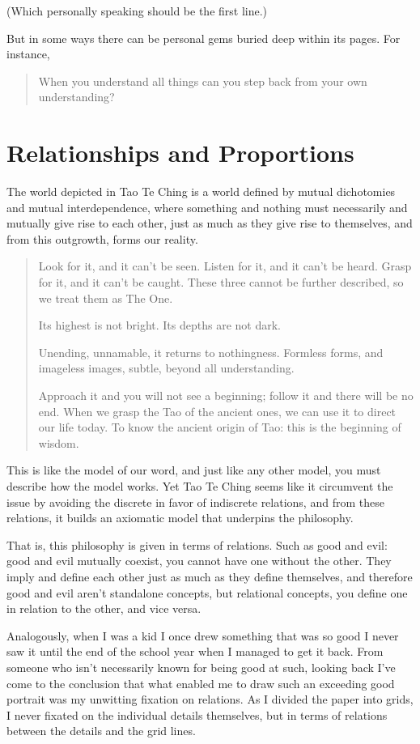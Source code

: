 (Which personally speaking should be the first line.)

But in some ways there can be personal gems buried deep within its pages. For instance,
\begin{quotation}
    When you understand all things can you step back from your own understanding? 
\end{quotation}


\section{Relationships and Proportions}

The world depicted in Tao Te Ching is a world defined by mutual dichotomies and mutual interdependence, where something and nothing must necessarily and mutually give rise to each other, just as much as they give rise to themselves, and from this outgrowth, forms our reality.

\begin{quotation}
Look for it, and it can't be seen.
Listen for it, and it can't be heard.
Grasp for it, and it can't be caught.
These three cannot be further described, so we treat them as The One. 

Its highest is not bright.
Its depths are not dark.

Unending, unnamable, it returns to nothingness.
Formless forms, and imageless images, subtle, beyond all understanding. 

Approach it and you will not see a beginning; follow it and there will be no end.
When we grasp the Tao of the ancient ones, we can use it to direct our life today. 
To know the ancient origin of Tao: this is the beginning of wisdom. 
\end{quotation}

This is like the model of our word, and just like any other model, you must describe how the model works. Yet Tao Te Ching seems like it circumvent the issue by avoiding the discrete in favor of indiscrete relations, and from these relations, it builds an axiomatic model that underpins the philosophy.

That is, this philosophy is given in terms of relations. Such as good and evil: good and evil mutually coexist, you cannot have one without the other. They imply and define each other just as much as they define themselves, and therefore good and evil aren’t standalone concepts, but relational concepts, you define one in relation to the other, and vice versa. 

Analogously, when I was a kid I once drew something that was so good I never saw it until the end of the school year when I managed to get it back. From someone who isn’t necessarily known for being good at such, looking back I’ve come to the conclusion that what enabled me to draw such an exceeding good portrait was my unwitting fixation on relations. As I divided the paper into grids, I never fixated on the individual details themselves, but in terms of relations between the details and the grid lines.

